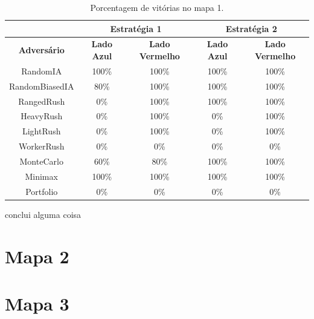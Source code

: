 \begin{table}[]
	\centering
	\caption{Porcentagem de vitórias no mapa 1.}
	\label{tab:mapa1}
	\begin{tabular}{|c|cc|cc|}
		\hline
		\textbf{}           & \multicolumn{2}{c|}{\textbf{Estratégia 1}}  & \multicolumn{2}{c|}{\textbf{Estratégia 2}}  \\ \hline
		\textbf{Adversário} & \textbf{Lado Azul} & \textbf{Lado Vermelho} & \textbf{Lado Azul} & \textbf{Lado Vermelho} \\ \hline
		RandomIA            & 100\%              & 100\%                  & 100\%              & 100\%                  \\ \hline
		RandomBiasedIA      & 80\%               & 100\%                  & 100\%              & 100\%                  \\ \hline
		RangedRush          & 0\%                & 100\%                  & 100\%              & 100\%                  \\ \hline
		HeavyRush           & 0\%                & 100\%                  & 0\%                & 100\%                  \\ \hline
		LightRush           & 0\%                & 100\%                  & 0\%                & 100\%                  \\ \hline
		WorkerRush          & 0\%                & 0\%                    & 0\%                & 0\%                    \\ \hline
		MonteCarlo          & 60\%               & 80\%                   & 100\%              & 100\%                  \\ \hline
		Minimax             & 100\%              & 100\%                  & 100\%              & 100\%                  \\ \hline
		Portfolio           & 0\%                & 0\%                    & 0\%                & 0\%                    \\ \hline
	\end{tabular}
\end{table}

conclui alguma coisa

\section{Mapa 2}

\section{Mapa 3}

